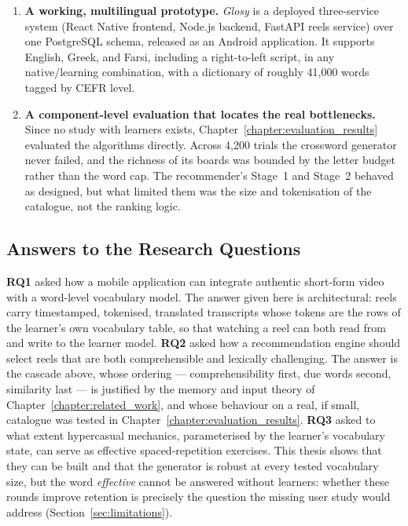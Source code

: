 \begin{enumerate}
        \item \textbf{A working, multilingual prototype.} \textit{Glosy} is a deployed three-service system (React Native frontend, Node.js backend, FastAPI reels service) over one PostgreSQL schema, released as an Android application. It supports English, Greek, and Farsi, including a right-to-left script, in any native/learning combination, with a dictionary of roughly 41{,}000 words tagged by CEFR level.
        \item \textbf{A component-level evaluation that locates the real bottlenecks.} Since no study with learners exists, Chapter~\ref{chapter:evaluation_results} evaluated the algorithms directly. Across 4{,}200 trials the crossword generator never failed, and the richness of its boards was bounded by the letter budget rather than the word cap. The recommender's Stage~1 and Stage~2 behaved as designed, but what limited them was the size and tokenisation of the catalogue, not the ranking logic.
    \end{enumerate}

    \subsection{Answers to the Research Questions}
    \label{subsec:rq_answers}
    \textbf{RQ1} asked how a mobile application can integrate authentic short-form video with a word-level vocabulary model. The answer given here is architectural: reels carry timestamped, tokenised, translated transcripts whose tokens are the rows of the learner's own vocabulary table, so that watching a reel can both read from and write to the learner model. \textbf{RQ2} asked how a recommendation engine should select reels that are both comprehensible and lexically challenging. The answer is the cascade above, whose ordering --- comprehensibility first, due words second, similarity last --- is justified by the memory and input theory of Chapter~\ref{chapter:related_work}, and whose behaviour on a real, if small, catalogue was tested in Chapter~\ref{chapter:evaluation_results}. \textbf{RQ3} asked to what extent hypercasual mechanics, parameterised by the learner's vocabulary state, can serve as effective spaced-repetition exercises. This thesis shows that they can be built and that the generator is robust at every tested vocabulary size, but the word \emph{effective} cannot be answered without learners: whether these rounds improve retention is precisely the question the missing user study would address (Section~\ref{sec:limitations}).

